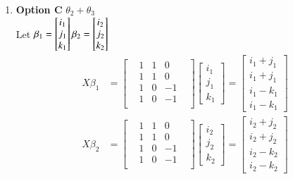 \documentclass{article}
\begin{document}
\begin{enumerate}
\item \textbf{Option C} $\theta_2 + \theta_3$\\
Let 
$\beta_1 = \begin{bmatrix} i_1\\ j_1\\ k_1\end{bmatrix}  \beta_2 = \begin{bmatrix} i_2\\ j_2\\ k_2 \end{bmatrix}\\$
\begin{align*}
\textit{X}\beta_1 &= \begin{bmatrix}
    &1&   1&   0&\\
    &1&   1&   0&\\
    &1&   0&  -1&\\
    &1&   0&  -1&\\
\end{bmatrix} \begin{bmatrix} i_1\\ j_1\\ k_1 \end{bmatrix} = \begin{bmatrix} i_1+j_1 \\ i_1+j_1 \\ i_1-k_1\\  i_1-k_1\end{bmatrix}\\
\textit{X}\beta_2 &= \begin{bmatrix}
    &1&   1&   0&\\
    &1&   1&   0&\\
    &1&   0&  -1&\\
    &1&   0&  -1&\\
\end{bmatrix} \begin{bmatrix} i_2\\ j_2\\ k_2 \end{bmatrix} = \begin{bmatrix} i_2+j_2 \\ i_2+j_2 \\ i_2-k_2\\  i_2-k_2\end{bmatrix}\\
\end{align*}


\end{enumerate}
\end{document}
